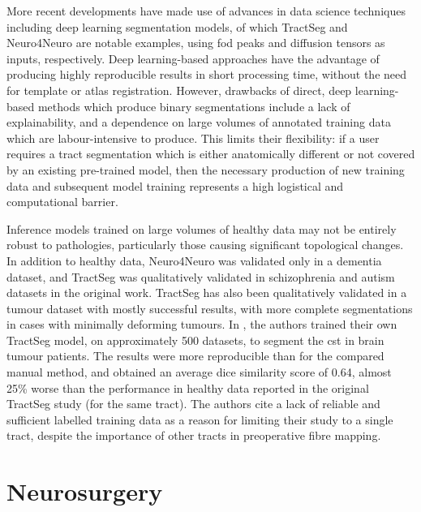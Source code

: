 More recent developments have made use of advances in data science techniques including deep learning segmentation models, of which TractSeg\autocite{Wasserthal2018} and Neuro4Neuro\textcite{Li2020} are notable examples, using \gls{fod} peaks and diffusion tensors as inputs, respectively.
Deep learning-based approaches have the advantage of producing highly reproducible results in short processing time, without the need for template or atlas registration.
However, drawbacks of direct, deep learning-based methods which produce binary segmentations include a lack of explainability, and a dependence on large volumes of annotated training data which are labour-intensive to produce.
This limits their flexibility: if a user requires a tract segmentation which is either anatomically different or not covered by an existing pre-trained model, then the necessary production of new training data and subsequent model training represents a high logistical and computational barrier.

Inference models trained on large volumes of healthy data may not be entirely robust to pathologies, particularly those causing significant topological changes.
In addition to healthy data, Neuro4Neuro\autocite{Li2020} was validated only in a dementia dataset, and TractSeg\autocite{Wasserthal2018} was qualitatively validated in schizophrenia and autism datasets in the original work.
TractSeg has also been qualitatively validated in a tumour dataset with mostly successful results, with more complete segmentations in cases with minimally deforming tumours.\autocite{Richards2021}
In \textcite{Moshe2022}, the authors trained their own TractSeg model, on approximately 500 datasets, to segment the \gls{cst} in brain tumour patients.
The results were more reproducible than for the compared manual method, and obtained an average dice similarity score of 0.64, almost 25\% worse than the performance in healthy data reported in the original TractSeg study (for the same tract).
The authors cite a lack of reliable and sufficient labelled training data as a reason for limiting their study to a single tract, despite the importance of other tracts in preoperative fibre mapping.

\section{Neurosurgery}\label{sec:neurosurgery}

